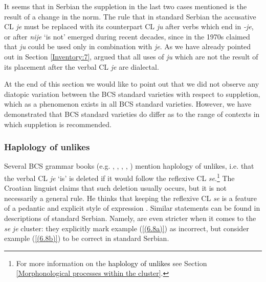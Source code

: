 
\noindent It seems that in Serbian the suppletion in the last two cases mentioned is the result of a change in the norm. The rule that in standard Serbian the accusative CL \textit{je} must be replaced with its counterpart CL \textit{ju} after verbs which end in \textit{-je}, or after \textit{nije} ‘is not’ emerged during recent decades, since in the 1970s \citet[306]{Stevanovic75} claimed that \textit{ju} could be used only in combination with \textit{je}. As we have already pointed out in Section \ref{Inventory:7}, \citet[306]{Stevanovic75} argued that all uses of \textit{ju} which are not the result of its placement after the verbal CL \textit{je} are dialectal. 

At the end of this section we would like to point out that we did not observe any diatopic variation between the BCS standard varieties with respect to suppletion, which as a phenomenon exists in all BCS standard varieties. However, we have demonstrated that BCS standard varieties do differ as to the range of contexts in which suppletion is recommended. 

\subsubsection{Haplology of unlikes}
\label{Haplology of unlikes}
Several BCS grammar books (e.g. \citealt[246]{TezakBabic96}, \citealt[596]{Baric97}, \citealt[471]{JHP00}, \citealt[302, 333]{Ridjanovic12}, \citealt[450]{PiperKlajn14}) mention haplology of unlikes, i.e. that the verbal CL \textit{je} ‘is’ is deleted if it would follow the reflexive CL \textit{se}.\footnote{For more information on the \textcolor{black}{haplology of unlikes} see Section \ref{Morphonological processes within the cluster}.} The Croatian linguist \citet[497]{Katicic86} claims that such deletion usually occurs, but it is not necessarily a general rule. He thinks that keeping the reflexive CL \textit{se} is a feature of a pedantic and explicit style of expression \citep[cf.][497]{Katicic86}. Similar statements can be found in descriptions of standard Serbian. Namely, \citet[452]{PiperKlajn14} are even stricter when it comes to the \textit{se} \textit{je} cluster: they explicitly mark example (\ref{(6.8a)}) as incorrect, but consider example (\ref{(6.8b)}) to be correct in standard Serbian.

